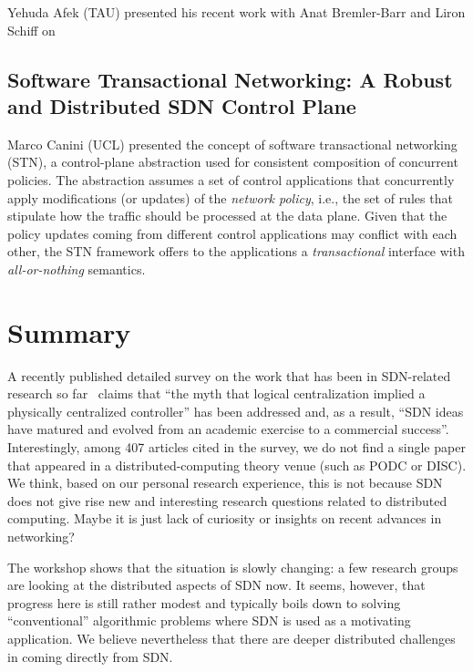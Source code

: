 \documentclass[11pt,pdftex,letter]{article}
\begin{document}
Yehuda Afek (TAU) presented his recent work with Anat Bremler-Barr and
Liron Schiff on  

\subsection{Software Transactional Networking: A Robust and
  Distributed SDN Control Plane}

Marco Canini (UCL) presented the concept of software transactional
networking (STN), a control-plane abstraction used for consistent
composition of concurrent policies. The abstraction assumes a set of
control applications that concurrently apply modifications (or
updates) of the
\emph{network policy}, i.e., the set of rules that stipulate how the
traffic should be processed at the data plane.     
Given that the policy updates coming from different control applications may
conflict with each other, the STN framework offers to the applications
a \emph{transactional} interface with \emph{all-or-nothing} semantics.    







\section{Summary}

A recently published detailed survey on the work that has been in
SDN-related research so far~\cite{sdn-survey} 
claims that ``the myth that logical centralization implied
a physically centralized controller'' has been addressed and, as a
result, ``SDN ideas have matured and evolved from
an academic exercise to a commercial success''. 
Interestingly, among 407 articles cited in the survey, we do not find
a single paper that appeared in a distributed-computing theory venue
(such as PODC or DISC).
We think, based on our personal research experience, this is not
because SDN does not give rise new and interesting
research questions related to distributed computing. 
Maybe it is just lack of curiosity or insights on recent
advances in networking?  
 
The workshop shows that the situation is slowly changing: a few
research groups are looking at the distributed aspects of SDN now.    
It seems, however, that progress here is still rather modest and
typically boils down to solving ``conventional'' algorithmic problems
where SDN is used as a motivating application. We believe nevertheless that
there are deeper distributed challenges in coming directly from SDN.  



\end{document}
